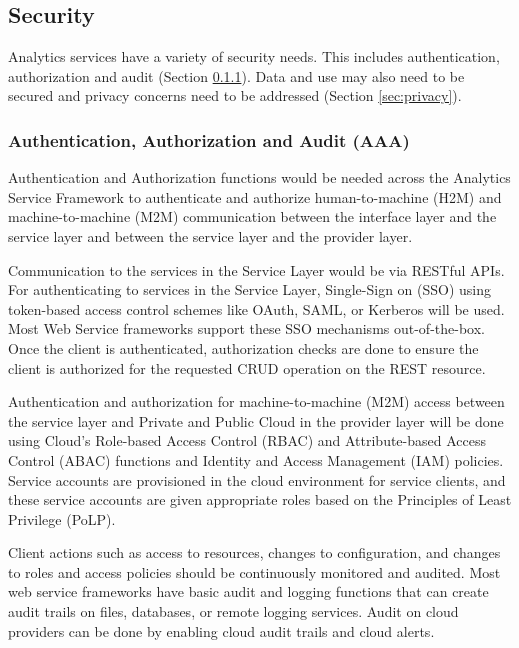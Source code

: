 
\subsection{Security}
\label{sec:security}

Analytics services have a variety of security needs. This includes
authentication, authorization and audit (Section \ref{sec:aaa}). Data
and use may also need to be secured and privacy concerns need to be
addressed (Section \ref{sec:privacy}).

\subsubsection{Authentication, Authorization and Audit (AAA)}\label{sec:aaa}

Authentication and Authorization functions would be needed across the
Analytics Service Framework to authenticate and authorize
human-to-machine (H2M) and machine-to-machine (M2M) communication
between the interface layer and the service layer and between the
service layer and the provider layer.

Communication to the services in the Service Layer would be via
RESTful APIs. For authenticating to services in the Service Layer,
Single-Sign on (SSO) using token-based access control schemes like
OAuth, SAML, or Kerberos will be used. Most Web Service frameworks
support these SSO mechanisms out-of-the-box. Once the client is
authenticated, authorization checks are done to ensure the client is
authorized for the requested CRUD operation on the REST resource.

Authentication and authorization for machine-to-machine (M2M) access
between the service layer and Private and Public Cloud in the provider
layer will be done using Cloud's Role-based Access Control (RBAC) and
Attribute-based Access Control (ABAC) functions and Identity and
Access Management (IAM) policies. Service accounts are provisioned in
the cloud environment for service clients, and these service accounts
are given appropriate roles based on the Principles of Least Privilege
(PoLP).

Client actions such as access to resources, changes to configuration, and changes to roles and access policies should be continuously
monitored and audited. Most web service frameworks have basic audit
and logging functions that can create audit trails on files,
databases, or remote logging services. Audit on cloud providers can be
done by enabling cloud audit trails and cloud alerts.

